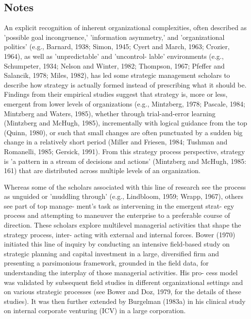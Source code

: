 \documentclass[12pt,letterpaper]{article}
\begin{document}
\subsection{\cite{Noda1996} Notes}
An explicit recognition of inherent organizational complexities, often described as 'possible goal incongruence,' 'information asymmetry,' and 'organizational politics' (e.g., Barnard, 1938; Simon, 1945; Cyert and March, 1963; Crozier, 1964), as well as 'unpredictable' and 'uncontrol- lable' environments (e.g., Schumpeter, 1934; Nelson and Winter, 1982; Thompson, 1967; Pfeffer and Salancik, 1978; Miles, 1982), has led some strategic management scholars to describe how strategy is actually formed instead of prescribing what it should be. Findings from their empirical studies suggest that strategy is, more or less, emergent from lower levels of organizations (e.g., Mintzberg, 1978; Pascale, 1984; Mintzberg and Waters, 1985), whether through trial-and-error learning (Mintzberg and McHugh, 1985), incrementally with logical guidance from the top (Quinn, 1980), or such that small changes are often punctuated by a sudden big change in a relatively short period (Miller and Friesen, 1984; Tushman and Romanelli, 1985; Gersick, 1991). From this strategy process perspective, strategy is 'a pattern in a stream of decisions and actions' (Mintzberg and McHugh, 1985: 161) that are distributed across multiple levels of an organization.

Whereas some of the scholars associated with this line of research see the process as unguided or 'muddling through' (e.g., Lindbloom, 1959; Wrapp, 1967), others see part of top manage- ment's task as intervening in the emergent strat- egy process and attempting to maneuver the enterprise to a preferable course of direction. These scholars explore multilevel managerial activities that shape the strategy process, inter- acting with external and internal forces. Bower (1970) initiated this line of inquiry by conducting an intensive field-based study on strategic planning and capital investment in a large, diversified firm and presenting a parsimonious framework, grounded in the field data, for understanding the interplay of those managerial activities. His pro- cess model was validated by subsequent field studies in different organizational settings and on various strategic processes (see Bower and Doz, 1979, for the details of these studies). It was then further extended by Burgelman (1983a) in his clinical study on internal corporate venturing (ICV) in a large corporation.
\end{document}
